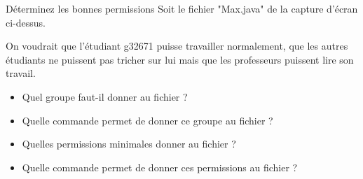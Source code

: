 \documentclass[a4paper,11pt]{article}
\begin{document}
	
\begin{Exercice}{D\'eterminez les bonnes permissions}	
	Soit le fichier "Max.java" de la capture d'\'ecran ci-dessus.
	
	On voudrait que l'\'etudiant g32671 puisse travailler  
	normalement, que les autres \'etudiants ne puissent pas tricher sur  
	lui mais que les professeurs puissent lire son travail.   
	
	\begin{itemize}
		
		\item 
		Quel groupe faut-il donner au fichier ?
		\par
		\textcolor{gray}{\underline{\hspace*{10em}}} 
		\item 
		Quelle commande permet de donner ce groupe au fichier ?
		\par
		\textcolor{gray}{\underline{\hspace*{3em}}}  \textcolor{gray}{\underline{\hspace*{10em}}}  \textcolor{gray}{\underline{\hspace*{10em}}} 
		\item 
		Quelles permissions minimales donner au fichier ?                
		\par
		\textcolor{gray}{\underline{\hspace*{1em}}}  \textcolor{gray}{\underline{\hspace*{1em}}}  \textcolor{gray}{\underline{\hspace*{1em}}}  \textcolor{gray}{\underline{\hspace*{1em}}}  \textcolor{gray}{\underline{\hspace*{1em}}}  \textcolor{gray}{\underline{\hspace*{1em}}}  \textcolor{gray}{\underline{\hspace*{1em}}}  \textcolor{gray}{\underline{\hspace*{1em}}}  \textcolor{gray}{\underline{\hspace*{1em}}} 
		\item 
		Quelle commande permet de donner ces permissions au fichier ?
		\par
		\textcolor{gray}{\underline{\hspace*{3em}}}  \textcolor{gray}{\underline{\hspace*{2em}}}  \textcolor{gray}{\underline{\hspace*{10em}}} 
	\end{itemize}
	
	
\end{Exercice}
\end{document}
